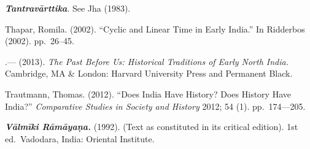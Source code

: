 \begin{thebibliography}{99}
  \textbf{\textit{Tantravārttika}}. See Jha (1983).

  Thapar, Romila. (2002). “Cyclic and Linear Time in Early India.” In Ridderbos (2002). pp.~26–45.

 .— (2013). \textit{The Past Before Us: Historical Traditions of Early North India.} Cambridge, MA \& London: Harvard University Press and Permanent Black.

  Trautmann, Thomas. (2012). “Does India Have History? Does History Have India?” \textit{Comparative Studies in Society and History} 2012; 54 (1). pp.~174––205.

  \textbf{\textit{Vālmīki Rāmāyaṇa.}} (1992). (Text as constituted in its critical edition). 1st ed.\ Vadodara, India: Oriental Institute.

 \end{thebibliography}

\theendnotes

